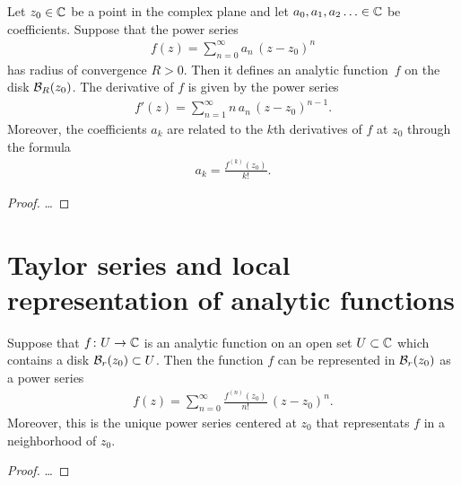 \begin{lemma}
  \label{lem:power_series_analytic}
  Let $z_0 \in \mathbb{C}$ be a point in the complex plane
  and let $a_0,a_1,a_2\ldots \in \mathbb{C}$ be coefficients.
  Suppose that the power series
  \begin{align*}
    f(z) = \sum_{n=0}^\infty a_n \, (z-z_0)^n
  \end{align*}
  has radius of convergence $R > 0$.
  Then it defines an analytic function~$f$ on the disk $\mathcal{B}_{{R}}(z_0)$.
  The derivative of $f$ is given by the power series
  \begin{align*}
    f'(z) = \sum_{n=1}^\infty n \, a_n \, (z-z_0)^{n-1} .
  \end{align*}
  Moreover, the coefficients $a_k$ are related to the $k$th derivatives of $f$
  at $z_0$ through the formula
  \begin{align*}
    a_k = \frac{f^{(k)}(z_0)}{k!} .
  \end{align*}
\end{lemma}
\begin{proof}
  \ldots
\end{proof}



\section{Taylor series and local representation of analytic functions}

\begin{theorem}
  \label{thm:analytic_function_taylor_series}
  Suppose that $f \colon U \to \mathbb{C}$ is an analytic function
  on an open set $U \subset \mathbb{C}$ which contains
  a disk $\mathcal{B}_{{r}}(z_0) \subset U$.
  Then the function $f$ can be represented in $\mathcal{B}_{{r}}(z_0)$
  as a power series
  \begin{align*}
    f(z) = \sum_{n=0}^\infty \frac{f^{(n)}(z_0)}{n!} \, (z-z_0)^n .
  \end{align*}
  Moreover, this is the unique power series centered at $z_0$
  that representats $f$ in a neighborhood of $z_0$.
\end{theorem}
\begin{proof}
  \ldots
\end{proof}

